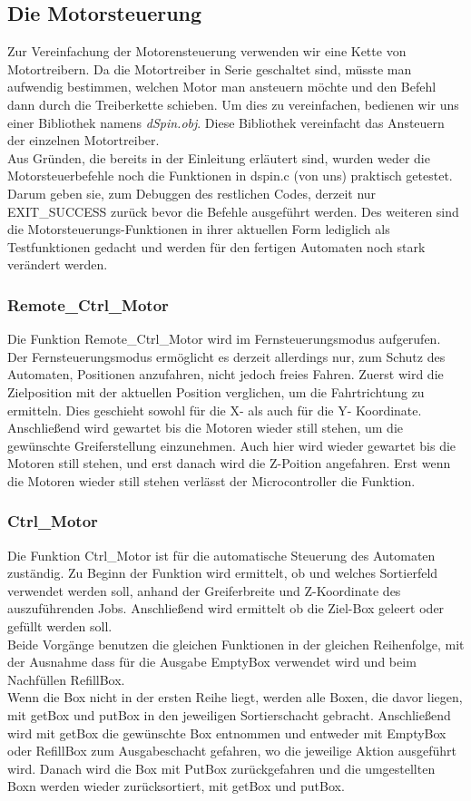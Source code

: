 \documentclass{scrartcl}
\begin{document}
\subsection{Die Motorsteuerung}
Zur Vereinfachung der Motorensteuerung verwenden wir eine Kette von Motortreibern. Da die Motortreiber in Serie geschaltet sind, müsste man aufwendig bestimmen, welchen Motor man ansteuern möchte und den Befehl dann durch die Treiberkette schieben. Um dies zu vereinfachen, bedienen wir uns einer Bibliothek namens \textit{dSpin.obj}. Diese Bibliothek vereinfacht das Ansteuern der einzelnen Motortreiber.\\
Aus Gründen, die bereits in der Einleitung erläutert sind, wurden weder die Motorsteuerbefehle noch die Funktionen in dspin.c (von uns) praktisch getestet. Darum geben sie, zum Debuggen des restlichen Codes, derzeit nur EXIT\_SUCCESS zurück bevor die Befehle ausgeführt werden. Des weiteren sind die Motorsteuerungs-Funktionen in ihrer aktuellen Form lediglich als Testfunktionen gedacht und werden für den fertigen Automaten noch stark verändert werden.

\subsubsection{Remote\_Ctrl\_Motor}
Die Funktion Remote\_Ctrl\_Motor wird im Fernsteuerungsmodus aufgerufen. Der Fernsteuerungsmodus ermöglicht es derzeit allerdings nur, zum Schutz des Automaten, Positionen anzufahren, nicht jedoch freies Fahren. Zuerst wird die Zielposition mit der aktuellen Position verglichen, um die Fahrtrichtung zu ermitteln. Dies geschieht sowohl für die X- als auch für die Y- Koordinate. Anschließend wird gewartet bis die Motoren wieder still stehen, um die gewünschte Greiferstellung einzunehmen. Auch hier wird wieder gewartet bis die Motoren still stehen, und erst danach wird die Z-Poition angefahren. Erst wenn die Motoren wieder still stehen verlässt der Microcontroller die Funktion.



\subsubsection{Ctrl\_Motor}
Die Funktion Ctrl\_Motor ist für die automatische Steuerung des Automaten zuständig. Zu Beginn der Funktion wird ermittelt, ob und welches Sortierfeld verwendet werden soll, anhand der Greiferbreite und Z-Koordinate des auszuführenden Jobs. Anschließend wird ermittelt ob die Ziel-Box geleert oder gefüllt werden soll.\\
Beide Vorgänge benutzen die gleichen Funktionen in der gleichen Reihenfolge, mit der Ausnahme dass für die Ausgabe EmptyBox verwendet wird und beim Nachfüllen RefillBox.\\
Wenn die Box nicht in der ersten Reihe liegt, werden alle Boxen, die davor liegen, mit getBox und putBox in den jeweiligen Sortierschacht gebracht. Anschließend wird mit getBox die gewünschte Box entnommen und entweder mit EmptyBox oder RefillBox zum Ausgabeschacht gefahren, wo die jeweilige Aktion ausgeführt wird. Danach wird die Box mit PutBox zurückgefahren und die umgestellten Boxn werden wieder zurücksortiert, mit getBox und putBox.
\end{document}
